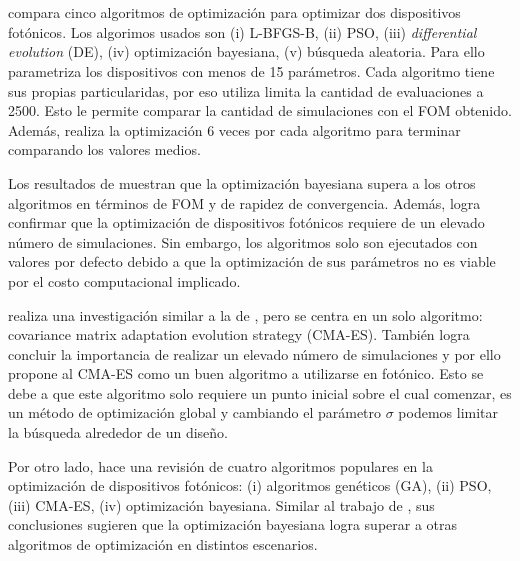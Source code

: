 \section{\cite{Schneider2019, Elsawy2020, Gregory2015}}

\cite{Schneider2019} compara cinco algoritmos de optimización para optimizar dos dispositivos fotónicos. 
Los algorimos usados son (i) L-BFGS-B, (ii) PSO, (iii) \emph{differential evolution} (DE), (iv) optimización bayesiana, (v) búsqueda aleatoria.
Para ello parametriza los dispositivos con menos de 15 parámetros.
Cada algoritmo tiene sus propias particularidas, por eso utiliza limita la cantidad de evaluaciones a 2500.
Esto le permite comparar la cantidad de simulaciones con el FOM obtenido.
Además, realiza la optimización 6 veces por cada algoritmo para terminar comparando los valores medios.

Los resultados de \cite{Schneider2019} muestran que la optimización bayesiana supera a los otros algoritmos en términos de FOM y de rapidez de convergencia.
Además, logra confirmar que la optimización de dispositivos fotónicos requiere de un elevado número de simulaciones.
Sin embargo, los algoritmos solo son ejecutados con valores por defecto debido a que la optimización de sus parámetros no es viable por el costo computacional implicado.


\cite{Gregory2015} realiza una investigación similar a la de \cite{Schneider2019}, pero se centra en un solo algoritmo: covariance matrix adaptation evolution strategy (CMA-ES).
También logra concluir la importancia de realizar un elevado número de simulaciones y por ello propone al CMA-ES como un buen algoritmo a utilizarse en fotónico.
Esto se debe a que este algoritmo solo requiere un punto inicial sobre el cual comenzar, es un método de optimización global y cambiando el parámetro $\sigma$ podemos limitar la búsqueda alrededor de un diseño.

Por otro lado, \cite{Elsawy2020} hace una revisión de cuatro algoritmos populares en la optimización de dispositivos fotónicos: (i) algoritmos genéticos (GA), (ii) PSO, (iii) CMA-ES, (iv) optimización bayesiana.
Similar al trabajo de \cite{Schneider2019}, sus conclusiones sugieren que la optimización bayesiana logra superar a otras algoritmos de optimización en distintos escenarios.

